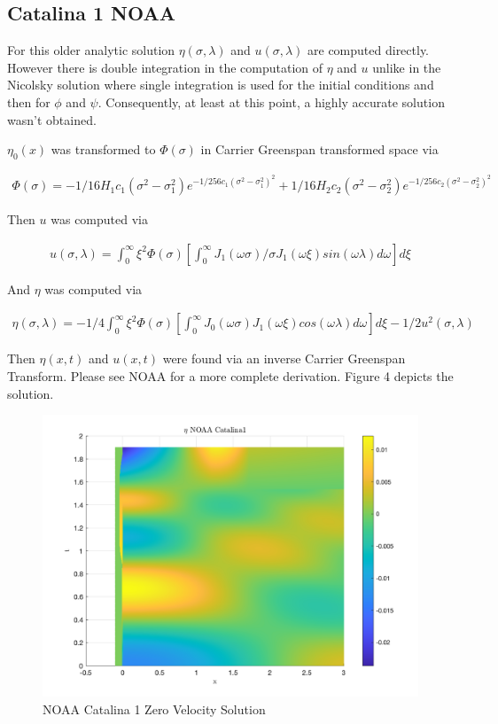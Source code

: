 \documentclass{article}
\begin{document}
\subsection{Catalina 1 NOAA}

For this older analytic solution $\eta(\sigma, \lambda)$ and $u(\sigma, \lambda)$ are computed directly. However there is double integration in the computation of $\eta$ and $u$ unlike in the Nicolsky solution where single integration is used for the initial conditions and then for $\phi$ and $\psi$. Consequently, at least at this point, a highly accurate solution wasn't obtained.

$\eta_0(x)$ was transformed to $\Phi(\sigma)$ in Carrier Greenspan transformed space via

\[
\begin{aligned}
\Phi(\sigma) = -1/16 H_1 c_1 (\sigma^2 - \sigma_1^2) e^{-1/256 c_1 (\sigma^2-\sigma_1^2)^2} + 1/16 H_2 c_2 (\sigma^2 - \sigma_2^2) e^{-1/256 c_2 (\sigma^2-\sigma_2^2)^2}
\end{aligned}
\]

Then $u$ was computed via

\[
\begin{aligned}
u(\sigma, \lambda) = \int_{0}^\infty \xi^2 \Phi(\sigma) \left[ \int_{0}^\infty J_1(\omega \sigma)/\sigma J_1(\omega \xi) sin(\omega \lambda) d\omega \right] d\xi
\end{aligned}
\]

And $\eta$ was computed via

\[
\begin{aligned}
\eta(\sigma, \lambda) = -1/4 \int_{0}^\infty \xi^2 \Phi(\sigma) \left[ \int_{0}^\infty J_0(\omega \sigma) J_1(\omega \xi) cos(\omega \lambda) d\omega \right] d\xi - 1/2 u^2(\sigma, \lambda)
\end{aligned}
\]

Then $\eta(x,t)$ and $u(x,t)$ were found via an inverse Carrier Greenspan Transform. Please see NOAA for a more complete derivation. Figure 4 depicts the solution.

\begin{figure}
   \includegraphics[scale=.3]{images/eta_NOAA_0u.png} 
   \caption{NOAA Catalina 1 Zero Velocity Solution}
\end{figure}
\end{document}
